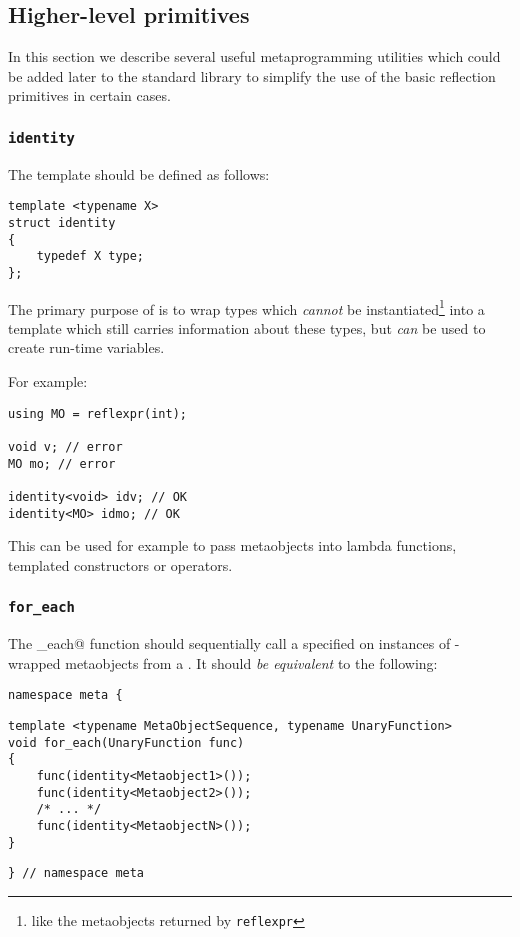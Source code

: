\subsection{Higher-level primitives}

In this section we describe several useful metaprogramming utilities which
could be added later to the standard library to simplify the use of the basic
reflection primitives in certain cases.
 
\subsubsection{\texttt{identity}}

The \verb@identity@ template should be defined as follows:

\begin{verbatim}
template <typename X>
struct identity
{
	typedef X type;
};
\end{verbatim}

The primary purpose of \verb@identity@ is to wrap types which {\em cannot} be
instantiated\footnote{like the metaobjects returned by \texttt{reflexpr}}
into a template which still carries information about these types, but
{\em can} be used to create run-time variables.

For example:

\begin{verbatim}
using MO = reflexpr(int);

void v; // error
MO mo; // error

identity<void> idv; // OK
identity<MO> idmo; // OK
\end{verbatim}
 
This can be used for example to pass metaobjects into lambda functions,
templated constructors or operators. 

\subsubsection{\texttt{for\_each}}

The \verb@for_each@ function should sequentially call a specified
\verb@UnaryFunction@ on instances of \verb@identity@-wrapped metaobjects from
a . It should {\em be equivalent} to the following:

\begin{verbatim}
namespace meta {
\end{verbatim}
\begin{verbatim}
template <typename MetaObjectSequence, typename UnaryFunction>
void for_each(UnaryFunction func)
{
	func(identity<Metaobject1>());
	func(identity<Metaobject2>());
	/* ... */
	func(identity<MetaobjectN>());
}
\end{verbatim}
\begin{verbatim}
} // namespace meta
\end{verbatim}

